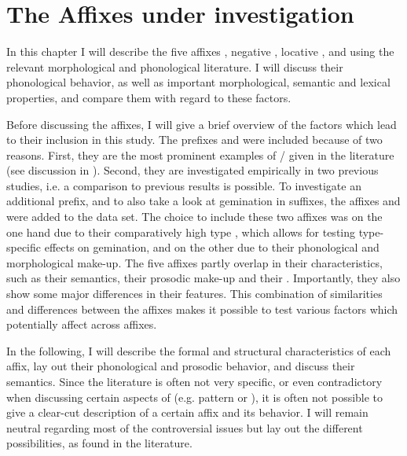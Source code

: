 
\chapter{The Affixes under investigation}{\label{affixes}}


In this chapter I will describe the five affixes , negative , locative ,  and  using the relevant morphological and phonological literature. I will discuss their phonological behavior, as well as important morphological, semantic and lexical properties, and compare them with regard to these factors.

Before discussing the affixes, I will give a brief overview of the factors which lead to their inclusion in this study.
The prefixes  and  were included because of two reasons.
First, they are the most prominent examples of / given in the literature (see discussion in ).  Second, they are investigated empirically in two previous studies, i.e. a comparison to previous results is possible. 
To investigate an additional prefix, and to also take a look at {gemination} in suffixes, the affixes  and   were added to the data set. The choice to include these two affixes was on the one hand due to their comparatively high type , which allows for testing type-specific effects on {gemination}, and  on the other due to their phonological and morphological make-up.
The five affixes partly overlap in their characteristics, such as their semantics, their prosodic make-up and their . Importantly, they also show some major differences in their features. This combination of similarities and differences between the affixes makes it possible to test various factors which potentially affect  across affixes.

In the following, I will describe the formal and structural characteristics of each affix, lay out their phonological and prosodic behavior, and discuss their semantics. Since the literature is often not very specific, or even contradictory when discussing certain aspects of  (e.g.  pattern or ), it is often not possible to give a clear-cut description of a certain affix and its behavior. I will remain neutral regarding most of the controversial issues but lay out the different possibilities, as found in the literature.  

